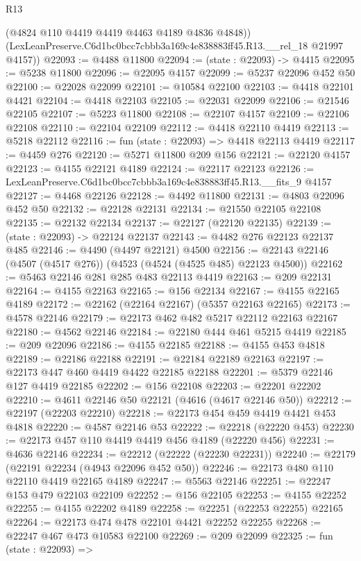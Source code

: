 \begin{lexlean}{R13}
\begin{coremodule}
        (@4824 @110 @4419 @4419 @4463 @4189 @4836 @4848))
      (LexLeanPreserve.C6d1bc0bcc7cbbb3a169c4e838883ff45.R13.__rel_18 @21997 @4157))
@22093 := @4488 @11800
@22094 := (state : @22093) -> @4415
@22095 := @5238 @11800
@22096 := @22095 @4157
@22099 := @5237 @22096 @452 @50
@22100 := @22028 @22099
@22101 := @10584 @22100
@22103 := @4418 @22101 @4421
@22104 := @4418 @22103
@22105 := @22031 @22099
@22106 := @21546 @22105
@22107 := @5223 @11800
@22108 := @22107 @4157
@22109 := @22106 @22108
@22110 := @22104 @22109
@22112 := @4418 @22110 @4419
@22113 := @5218 @22112
@22116 := fun (state : @22093) => @4418 @22113 @4419
@22117 := @4459 @276
@22120 := @5271 @11800 @209 @156
@22121 := @22120 @4157
@22123 := @4155 @22121 @4189
@22124 := @22117 @22123
@22126 := LexLeanPreserve.C6d1bc0bcc7cbbb3a169c4e838883ff45.R13.__fits_9 @4157
@22127 := @4468 @22126
@22128 := @4492 @11800
@22131 := @4803 @22096 @452 @50
@22132 := @22128 @22131
@22134 := @21550 @22105 @22108
@22135 := @22132 @22134
@22137 := @22127 (@22120 @22135)
@22139 := (state : @22093) -> @22124 @22137
@22143 := @4482 @276 @22123 @22137 @485
@22146 := @4490 (@4497 @22121) @4500
@22156 := @22143 @22146 (@4507 (@4517 @276)) (@4523 (@4524 (@4525 @485) @22123 @4500))
@22162 := @5463 @22146 @281 @285 @483 @22113 @4419
@22163 := @209 @22131
@22164 := @4155 @22163
@22165 := @156 @22134
@22167 := @4155 @22165 @4189
@22172 := @22162 (@22164 @22167) (@5357 @22163 @22165)
@22173 := @4578 @22146
@22179 := @22173 @462 @482 @5217 @22112 @22163 @22167
@22180 := @4562 @22146
@22184 := @22180 @444 @461 @5215 @4419
@22185 := @209 @22096
@22186 := @4155 @22185
@22188 := @4155 @453 @4818
@22189 := @22186 @22188
@22191 := @22184 @22189 @22163
@22197 := @22173 @447 @460 @4419 @4422 @22185 @22188
@22201 := @5379 @22146 @127 @4419 @22185
@22202 := @156 @22108
@22203 := @22201 @22202
@22210 := @4611 @22146 @50 @22121 (@4616 (@4617 @22146 @50))
@22212 := @22197 (@22203 @22210)
@22218 := @22173 @454 @459 @4419 @4421 @453 @4818
@22220 := @4587 @22146 @53
@22222 := @22218 (@22220 @453)
@22230 := @22173 @457 @110 @4419 @4419 @456 @4189 (@22220 @456)
@22231 := @4636 @22146
@22234 := @22212 (@22222 (@22230 @22231))
@22240 := @22179 (@22191 @22234 (@4943 @22096 @452 @50))
@22246 := @22173 @480 @110 @22110 @4419 @22165 @4189
@22247 := @5563 @22146
@22251 := @22247 @153 @479 @22103 @22109
@22252 := @156 @22105
@22253 := @4155 @22252
@22255 := @4155 @22202 @4189
@22258 := @22251 (@22253 @22255) @22165
@22264 := @22173 @474 @478 @22101 @4421 @22252 @22255
@22268 := @22247 @467 @473 @10583 @22100
@22269 := @209 @22099
@22325 := fun (state : @22093) =>

\end{coremodule}
\end{lexlean}
